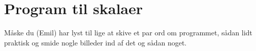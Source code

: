 \section{Program til skalaer}
\label{TestAfSkalaProgramSkala}
%
Måske du (Emil) har lyst til lige at skive et par ord om programmet, sådan lidt praktisk og smide nogle billeder ind af det og sådan noget. 